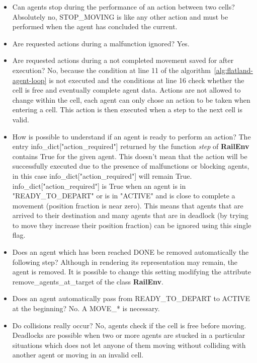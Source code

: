 \documentclass[11pt, a4paper, hidelinks]{report}
\begin{document}
\begin{itemize}
	\item Can agents stop during the performance of an action between two cells?
Absolutely no, STOP\_MOVING is like any other action and must be performed when the agent has concluded the current.
	\item Are requested actions during a malfunction ignored?
Yes.
	\item Are requested actions during a not completed movement saved for after execution?
No, because the condition at line 11 of the algorithm~\ref{alg:flatland-agent-loop} is not executed and the conditions at line 16 check whether the cell is free and eventually complete agent data.
Actions are not allowed to change within the cell, each agent can only chose an action to be taken when entering a cell.
This action is then executed when a step to the next cell is valid.
	\item How is possible to understand if an agent is ready to perform an action?
The entry info\_dict["action\_required"] returned by the function \textit{step} of \textbf{RailEnv} contains True for the given agent.
This doesn't mean that the action will be successfully executed due to the presence of malfunctions or blocking agents, in this case info\_dict["action\_required"] will remain True.
info\_dict["action\_required"] is True when an agent is in "READY\_TO\_DEPART" or is in "ACTIVE" and is close to complete a movement (position fraction is near zero).
This means that agents that are arrived to their destination and many agents that are in deadlock (by trying to move they increase their position fraction) can be ignored using this single flag.
	\item Does an agent which has been reached DONE be removed automatically the following step?
Although in rendering its representation may remain, the agent is removed.
It is possible to change this setting modifying the attribute remove\_agents\_at\_target of the class \textbf{RailEnv}.
	\item Does an agent automatically pass from READY\_TO\_DEPART to ACTIVE at the beginning?
No. A MOVE\_* is necessary.
	\item Do collisions really occur?
No, agents check if the cell is free before moving.
Deadlocks are possible when two or more agents are stucked in a particular situations which does not let anyone of them moving without colliding with another agent or moving in an invalid cell.
\end{itemize}
\end{document}
